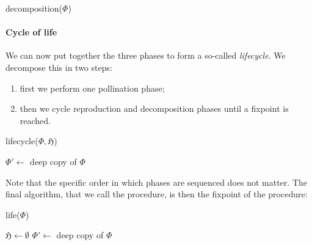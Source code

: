 \begin{scope}
\begin{procedure}[H]
  \caption{decomposition($\Phi$)}
  \BlankLine

\end{procedure}

\paragraph{Cycle of life}

We can now put together the three phases to form a so-called \emph{lifecycle}.
We decompose this in two steps:
\begin{enumerate}
  \item first we perform one pollination phase;
  \item then we cycle reproduction and decomposition phases until a fixpoint is
  reached.
\end{enumerate}

\begin{procedure}[H]
  \caption{lifecycle($\Phi, \mathfrak{H}$)}
  \BlankLine

  \;
  \BlankLine
  
  $\Phi' \longleftarrow $ deep copy of $\Phi$\;
  \;
  \;
\end{procedure}

Note that the specific order in which phases are sequenced does not matter. The
final algorithm, that we call the  procedure, is then the fixpoint
of the  procedure:

\begin{procedure}[H]
  \caption{life($\Phi$)}
  \BlankLine

  $\mathfrak{H} \longleftarrow \emptyset$\;
  $\Phi' \longleftarrow $ deep copy of $\Phi$\;
  \;
\end{procedure}


\end{scope}
